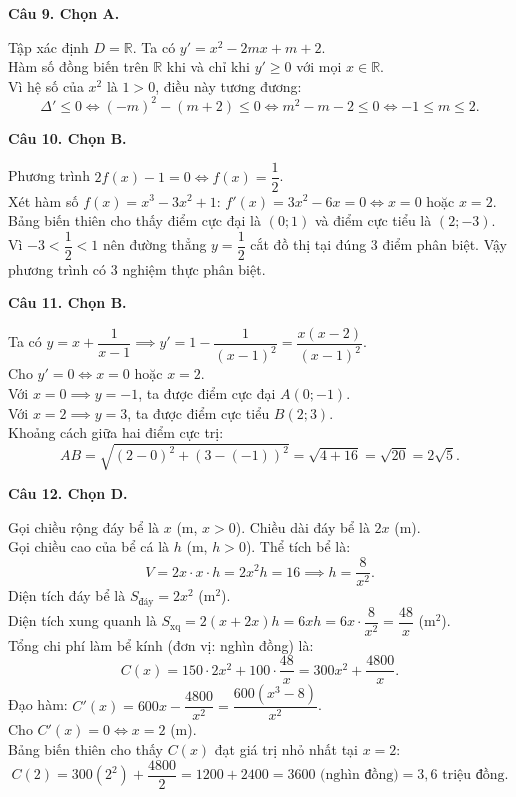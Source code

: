 \documentclass[12pt,a4paper]{article}
\newcommand{\loigiai}[1]{\par\medskip\Needspace{4\baselineskip}\noindent\textbf{#1}\par\nobreak}
\begin{document}
\loigiai{Câu 9. Chọn A.}
Tập xác định $D = \mathbb{R}$. Ta có $y' = x^2 - 2mx + m + 2$.\\
Hàm số đồng biến trên $\mathbb{R}$ khi và chỉ khi $y' \ge 0$ với mọi $x \in \mathbb{R}$.\\
Vì hệ số của $x^2$ là $1 > 0$, điều này tương đương:
\[\Delta' \le 0 \iff (-m)^2 - (m + 2) \le 0 \iff m^2 - m - 2 \le 0 \iff -1 \le m \le 2.\]

\loigiai{Câu 10. Chọn B.}
Phương trình $2f(x) - 1 = 0 \iff f(x) = \dfrac{1}{2}$.\\
Xét hàm số $f(x) = x^3 - 3x^2 + 1$: $f'(x) = 3x^2 - 6x = 0 \iff x = 0$ hoặc $x = 2$.\\
Bảng biến thiên cho thấy điểm cực đại là $(0; 1)$ và điểm cực tiểu là $(2; -3)$.\\
Vì $-3 < \dfrac{1}{2} < 1$ nên đường thẳng $y = \dfrac{1}{2}$ cắt đồ thị tại đúng $3$ điểm phân biệt. Vậy phương trình có $3$ nghiệm thực phân biệt.

\loigiai{Câu 11. Chọn B.}
Ta có $y = x + \dfrac{1}{x - 1} \implies y' = 1 - \dfrac{1}{(x-1)^2} = \dfrac{x(x-2)}{(x-1)^2}$.\\
Cho $y' = 0 \iff x = 0$ hoặc $x = 2$.\\
Với $x = 0 \implies y = -1$, ta được điểm cực đại $A(0; -1)$.\\
Với $x = 2 \implies y = 3$, ta được điểm cực tiểu $B(2; 3)$.\\
Khoảng cách giữa hai điểm cực trị:
\[AB = \sqrt{(2 - 0)^2 + (3 - (-1))^2} = \sqrt{4 + 16} = \sqrt{20} = 2\sqrt{5}.\]

\loigiai{Câu 12. Chọn D.}
Gọi chiều rộng đáy bể là $x$ (m, $x > 0$). Chiều dài đáy bể là $2x$ (m).\\
Gọi chiều cao của bể cá là $h$ (m, $h > 0$). Thể tích bể là:
\[V = 2x \cdot x \cdot h = 2x^2 h = 16 \implies h = \dfrac{8}{x^2}.\]
Diện tích đáy bể là $S_{\text{đáy}} = 2x^2$ ($\text{m}^2$).\\
Diện tích xung quanh là $S_{\text{xq}} = 2(x + 2x)h = 6xh = 6x \cdot \dfrac{8}{x^2} = \dfrac{48}{x}$ ($\text{m}^2$).\\
Tổng chi phí làm bể kính (đơn vị: nghìn đồng) là:
\[C(x) = 150 \cdot 2x^2 + 100 \cdot \dfrac{48}{x} = 300x^2 + \dfrac{4800}{x}.\]
Đạo hàm: $C'(x) = 600x - \dfrac{4800}{x^2} = \dfrac{600(x^3 - 8)}{x^2}$.\\
Cho $C'(x) = 0 \iff x = 2$ (m).\\
Bảng biến thiên cho thấy $C(x)$ đạt giá trị nhỏ nhất tại $x = 2$:
\[C(2) = 300(2^2) + \dfrac{4800}{2} = 1200 + 2400 = 3600\text{ (nghìn đồng)} = 3{,}6\text{ triệu đồng}.\]
\end{document}

